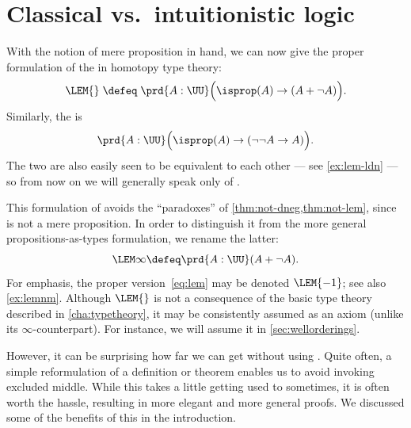 \section{Classical vs.\ intuitionistic logic}
\label{sec:intuitionism}

%
%
With the notion of mere proposition in hand, we can now give the proper formulation of the 
%
%
%
in homotopy type theory:
\begin{equation}
  \label{eq:lem}
  \LEM{}\;\defeq\;
  \prd{A:\UU} \Big(\isprop(A) \to (A + \neg A)\Big).
\end{equation}
Similarly, the 
%
%
%
is
\begin{equation}
  \label{eq:ldn}
  \prd{A:\UU} \Big(\isprop(A) \to (\neg\neg A \to A)\Big).
\end{equation}
The two are also easily seen to be equivalent to each other --- see \cref{ex:lem-ldn} --- so from now on we will generally speak only of \LEM{}.

This formulation of \LEM{} avoids the ``paradoxes'' of \cref{thm:not-dneg,thm:not-lem}, since \bool is not a mere proposition.
In order to distinguish it from the more general propositions-as-types formulation, we rename the latter:
\begin{equation*}
  \LEM\infty \defeq \prd{A:\UU} (A + \neg A).
\end{equation*}
For emphasis, the proper version~\eqref{eq:lem}
may be denoted $\LEM{-1}$;
see also \cref{ex:lemnm}.
Although $\LEM{}$
is not a consequence of the basic type theory described in \cref{cha:typetheory}, it may be consistently assumed as an axiom (unlike its $\infty$-counterpart).
For instance, we will assume it in \cref{sec:wellorderings}.

However, it can be surprising how far we can get without using \LEM{}.
Quite often, a simple reformulation of a definition or theorem enables us to avoid invoking excluded middle.
While this takes a little getting used to sometimes, it is often worth the hassle, resulting in more elegant and more general proofs.
We discussed some of the benefits of this in the introduction.

